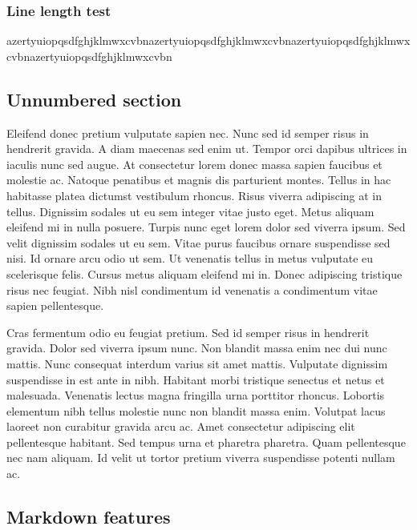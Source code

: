 \documentclass[
]{tufte-pandoc}
\begin{document}
\hypertarget{line-length-test}{%
\subsubsection{Line length test}\label{line-length-test}}

azertyuiopqsdfghjklmwxcvbnazertyuiopqsdfghjklmwxcvbnazertyuiopqsdfghjklmwxcvbnazertyuiopqsdfghjklmwxcvbn

\hypertarget{unnumbered-section}{%
\subsection*{Unnumbered section}\label{unnumbered-section}}

Eleifend donec pretium vulputate sapien nec. Nunc sed id semper risus in
hendrerit gravida. A diam maecenas sed enim ut. Tempor orci dapibus
ultrices in iaculis nunc sed augue. At consectetur lorem donec massa
sapien faucibus et molestie ac. Natoque penatibus et magnis dis
parturient montes. Tellus in hac habitasse platea dictumst vestibulum
rhoncus. Risus viverra adipiscing at in tellus. Dignissim sodales ut eu
sem integer vitae justo eget. Metus aliquam eleifend mi in nulla
posuere. Turpis nunc eget lorem dolor sed viverra ipsum. Sed velit
dignissim sodales ut eu sem. Vitae purus faucibus ornare suspendisse sed
nisi. Id ornare arcu odio ut sem. Ut venenatis tellus in metus vulputate
eu scelerisque felis. Cursus metus aliquam eleifend mi in. Donec
adipiscing tristique risus nec feugiat. Nibh nisl condimentum id
venenatis a condimentum vitae sapien pellentesque.

Cras fermentum odio eu feugiat pretium. Sed id semper risus in hendrerit
gravida. Dolor sed viverra ipsum nunc. Non blandit massa enim nec dui
nunc mattis. Nunc consequat interdum varius sit amet mattis. Vulputate
dignissim suspendisse in est ante in nibh. Habitant morbi tristique
senectus et netus et malesuada. Venenatis lectus magna fringilla urna
porttitor rhoncus. Lobortis elementum nibh tellus molestie nunc non
blandit massa enim. Volutpat lacus laoreet non curabitur gravida arcu
ac. Amet consectetur adipiscing elit pellentesque habitant. Sed tempus
urna et pharetra pharetra. Quam pellentesque nec nam aliquam. Id velit
ut tortor pretium viverra suspendisse potenti nullam ac.

\hypertarget{markdown-features}{%
\subsection{Markdown features}\label{markdown-features}}
\end{document}
